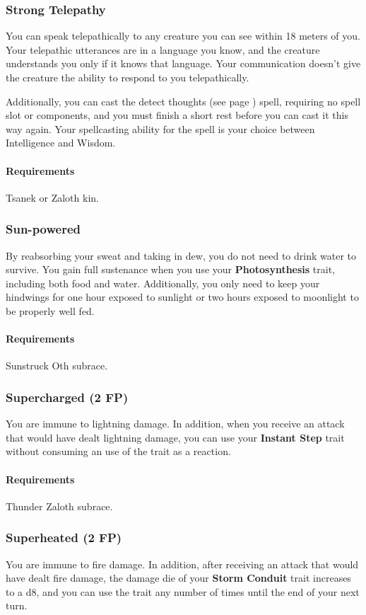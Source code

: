 \subsubsection{Strong Telepathy} \label{feat::strongtelepathy}
    You can speak telepathically to any creature you can see within 18 meters of you.
    Your telepathic utterances are in a language you know, and the creature understands you only if it knows that language.
    Your communication doesn't give the creature the ability to respond to you telepathically.

    Additionally, you can cast the detect thoughts (see page \pageref{spell::detectthoughts}) spell, requiring no spell slot or components, and you must finish a short rest before you can cast it this way again.
    Your spellcasting ability for the spell is your choice between Intelligence and Wisdom.
    \paragraph{Requirements} Tsanek or Zaloth kin.
\subsubsection{Sun-powered} \label{feat::sunpowered}
    By reabsorbing your sweat and taking in dew, you do not need to drink water to survive.
    You gain full sustenance when you use your \textbf{Photosynthesis} trait, including both food and water.
    Additionally, you only need to keep your hindwings for one hour exposed to sunlight or two hours exposed to moonlight to be properly well fed.
    \paragraph{Requirements} Sunstruck Oth subrace.
\subsubsection{Supercharged (2 FP)} \label{feat::supercharged}
    You are immune to lightning damage.
    In addition, when you receive an attack that would have dealt lightning damage, you can use your \textbf{Instant Step} trait without consuming an use of the trait as a reaction.
    \paragraph{Requirements} Thunder Zaloth subrace.
\subsubsection{Superheated (2 FP)} \label{feat::superheated}
    You are immune to fire damage.
    In addition, after receiving an attack that would have dealt fire damage, the damage die of your \textbf{Storm Conduit} trait increases to a d8, and you can use the trait any number of times until the end of your next turn.

